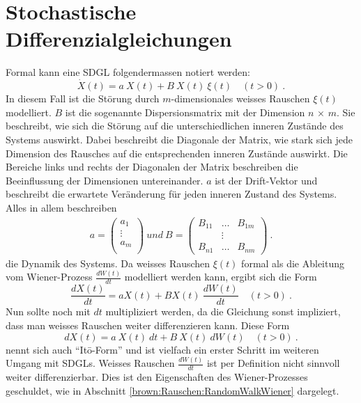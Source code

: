 %
%
%
%

\section{Stochastische Differenzialgleichungen\label{brown:SDGL}}

Formal kann eine SDGL folgendermassen notiert werden: 
\begin{equation}
	\label{brown:SDGL:whiteNoise}
	\dot{X}(t) = a \ X(t) + B \ X(t) \ \xi(t) \quad (t>0) \ .
\end{equation}
In diesem Fall ist die Störung durch $ m $-dimensionales weisses Rauschen $ \xi(t) $ modelliert. $ B $ ist die sogenannte Dispersionsmatrix mit der Dimension $ n $ $\times $ $ m $. Sie beschreibt, wie sich die Störung auf die unterschiedlichen inneren Zustände des Systems auswirkt. Dabei beschreibt die Diagonale der Matrix, wie stark sich jede Dimension des Rausches auf die entsprechenden inneren Zustände auswirkt. Die Bereiche links und rechts der Diagonalen der Matrix beschreiben die Beeinflussung der Dimensionen untereinander. $ a $ ist der Drift-Vektor und beschreibt die erwartete Veränderung für jeden inneren Zustand des Systems. Alles in allem beschreiben
\begin{align*}
	a = 
	\begin{pmatrix}
		a_{1} \\
		\vdots \\
		a_{m}\\ 
	\end{pmatrix}
	\ und \
	B = 
	\begin{pmatrix}
		B_{11} & \dots & B_{1m} \\
		& \vdots & \\
		B_{n1} & \dots & B_{nm} 
	\end{pmatrix} \ .
\end{align*}
die Dynamik des Systems. Da weisses Rauschen $ \xi(t) $ formal als die Ableitung vom Wiener-Prozess $ \frac{dW(t)}{dt} $ modelliert werden kann, ergibt sich die Form
\begin{equation}
	\frac{dX(t)}{dt} = aX(t) + BX(t) \ \frac{dW(t)}{dt} \quad (t>0) \ .
\end{equation}
Nun sollte noch mit $ dt $  multipliziert werden, da die Gleichung sonst impliziert, dass man weisses Rauschen weiter differenzieren kann. Diese Form
\begin{equation}
	dX(t) = a \ X(t) \ dt + B \ X(t) \ dW(t) \quad (t>0) \ .
\end{equation}
nennt sich auch ``Itō-Form'' und ist vielfach ein erster Schritt im weiteren Umgang mit SDGLs.
Weisses Rauschen $ \frac{dW(t)}{dt} $ ist per Definition nicht sinnvoll weiter differenzierbar. Dies ist den Eigenschaften des Wiener-Prozesses geschuldet, wie in Abschnitt \ref{brown:Rauschen:RandomWalkWiener} dargelegt.



